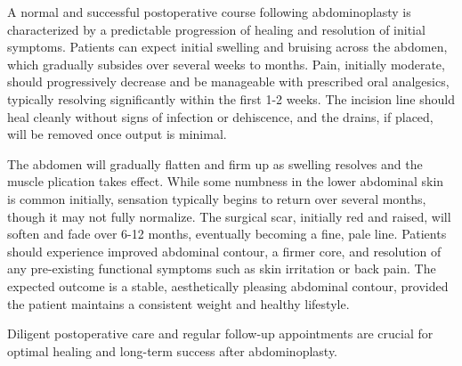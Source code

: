 A normal and successful postoperative course following abdominoplasty is characterized by a predictable progression of healing and resolution of initial symptoms. Patients can expect initial swelling and bruising across the abdomen, which gradually subsides over several weeks to months. Pain, initially moderate, should progressively decrease and be manageable with prescribed oral analgesics, typically resolving significantly within the first 1-2 weeks. The incision line should heal cleanly without signs of infection or dehiscence, and the drains, if placed, will be removed once output is minimal.

The abdomen will gradually flatten and firm up as swelling resolves and the muscle plication takes effect. While some numbness in the lower abdominal skin is common initially, sensation typically begins to return over several months, though it may not fully normalize. The surgical scar, initially red and raised, will soften and fade over 6-12 months, eventually becoming a fine, pale line. Patients should experience improved abdominal contour, a firmer core, and resolution of any pre-existing functional symptoms such as skin irritation or back pain. The expected outcome is a stable, aesthetically pleasing abdominal contour, provided the patient maintains a consistent weight and healthy lifestyle.

Diligent postoperative care and regular follow-up appointments are crucial for optimal healing and long-term success after abdominoplasty.

